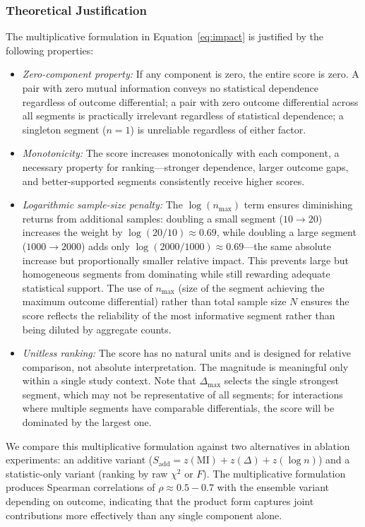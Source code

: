 \documentclass[conference]{IEEEtran}
\begin{document}
\subsubsection{Theoretical Justification}

The multiplicative formulation in Equation~\ref{eq:impact} is justified by the following properties:

\begin{itemize}
    \item \textit{Zero-component property:} If any component is zero, the entire score is zero. A pair with zero mutual information conveys no statistical dependence regardless of outcome differential; a pair with zero outcome differential across all segments is practically irrelevant regardless of statistical dependence; a singleton segment ($n=1$) is unreliable regardless of either factor.
    \item \textit{Monotonicity:} The score increases monotonically with each component, a necessary property for ranking---stronger dependence, larger outcome gaps, and better-supported segments consistently receive higher scores.
    \item \textit{Logarithmic sample-size penalty:} The $\log(n_{\max})$ term ensures diminishing returns from additional samples: doubling a small segment ($10\to20$) increases the weight by $\log(20/10) \approx 0.69$, while doubling a large segment ($1000\to2000$) adds only $\log(2000/1000) \approx 0.69$---the same absolute increase but proportionally smaller relative impact. This prevents large but homogeneous segments from dominating while still rewarding adequate statistical support. The use of $n_{\max}$ (size of the segment achieving the maximum outcome differential) rather than total sample size $N$ ensures the score reflects the reliability of the most informative segment rather than being diluted by aggregate counts.
    \item \textit{Unitless ranking:} The score has no natural units and is designed for relative comparison, not absolute interpretation. The magnitude is meaningful only within a single study context. Note that $\Delta_{\max}$ selects the single strongest segment, which may not be representative of all segments; for interactions where multiple segments have comparable differentials, the score will be dominated by the largest one.
\end{itemize}

We compare this multiplicative formulation against two alternatives in ablation experiments: an additive variant ($S_{\text{add}} = z(\text{MI}) + z(\Delta) + z(\log n)$) and a statistic-only variant (ranking by raw $\chi^2$ or $F$). The multiplicative formulation produces Spearman correlations of $\rho \approx 0.5-0.7$ with the ensemble variant depending on outcome, indicating that the product form captures joint contributions more effectively than any single component alone.
\end{document}

